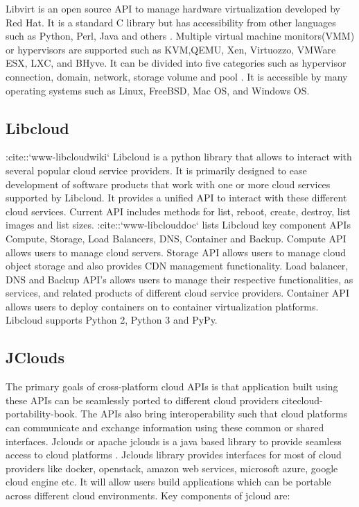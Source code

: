 {     Libvirt is an open source API to manage hardware virtualization
     developed by Red Hat.  It is a standard C library but has
     accessibility from other languages such as Python, Perl, Java and
     others \cite{www-libvirt}. Multiple virtual machine
     monitors(VMM) or hypervisors are supported such as KVM,QEMU, Xen,
     Virtuozzo, VMWare ESX, LXC, and BHyve.  It can be divided into
     five categories such as hypervisor connection, domain, network,
     storage volume and pool \cite{www-ibm}. It is accessible by
     many operating systems such as Linux, FreeBSD, Mac OS, and
     Windows OS.

     \pv
     
\subsection{Libcloud}

     :cite::`www-libcloudwiki` Libcloud is a python library that
     allows to interact with several popular cloud service
     providers. It is primarily designed to ease development of
     software products that work with one or more cloud services
     supported by Libcloud. It provides a unified API to interact with
     these different cloud services. Current API includes methods for
     list, reboot, create, destroy, list images and list
     sizes. :cite::`www-libclouddoc` lists Libcloud key component APIs
     Compute, Storage, Load Balancers, DNS, Container and
     Backup. Compute API allows users to manage cloud servers. Storage
     API allows users to manage cloud object storage and also provides
     CDN management functionality. Load balancer, DNS and Backup API’s
     allows users to manage their respective functionalities, as
     services, and related products of different cloud service
     providers. Container API allows users to deploy containers on to
     container virtualization platforms. Libcloud supports Python 2,
     Python 3 and PyPy.

     \pv
     
\subsection{JClouds}

     The primary goals of cross-platform
     cloud APIs is that application built using these APIs can be
     seamlessly ported to different cloud providers cite{cloud-portability-book}.
     The APIs also
     bring interoperability such that cloud platforms can communicate
     and exchange information using these common or shared interfaces.
     Jclouds or apache jclouds is a java based
     library to provide seamless access to cloud platforms \cite{www-jclouds}.
     Jclouds
     library provides interfaces for most of cloud providers like
     docker, openstack, amazon web services, microsoft azure, google
     cloud engine etc. It will allow users build applications which
     can be portable across different cloud environments.  Key
     components of jcloud are:

}
